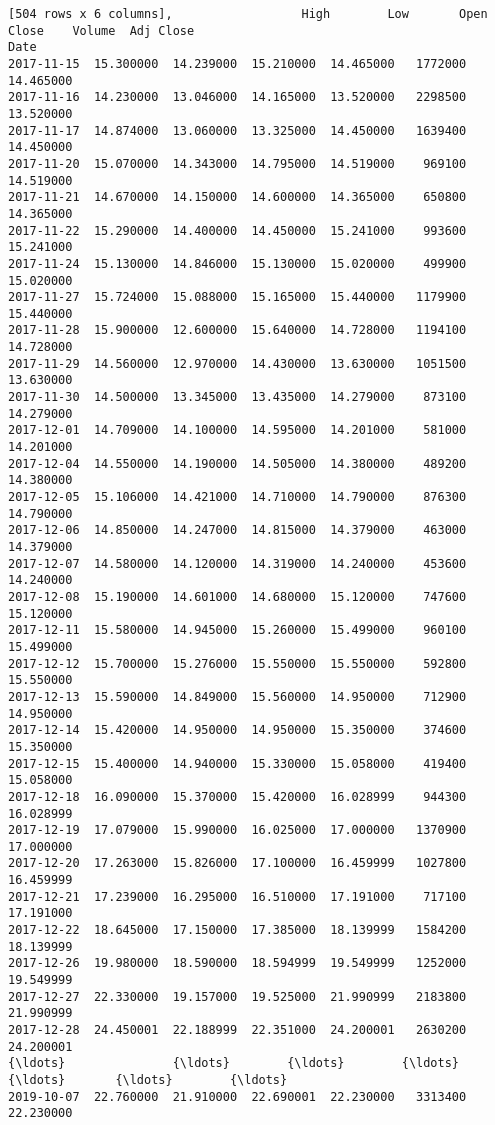 \documentclass[11pt]{article}
\begin{document}
\begin{Verbatim}[commandchars=\\\{\}]
[504 rows x 6 columns],                  High        Low       Open      Close    Volume  Adj Close
Date                                                                       
2017-11-15  15.300000  14.239000  15.210000  14.465000   1772000  14.465000
2017-11-16  14.230000  13.046000  14.165000  13.520000   2298500  13.520000
2017-11-17  14.874000  13.060000  13.325000  14.450000   1639400  14.450000
2017-11-20  15.070000  14.343000  14.795000  14.519000    969100  14.519000
2017-11-21  14.670000  14.150000  14.600000  14.365000    650800  14.365000
2017-11-22  15.290000  14.400000  14.450000  15.241000    993600  15.241000
2017-11-24  15.130000  14.846000  15.130000  15.020000    499900  15.020000
2017-11-27  15.724000  15.088000  15.165000  15.440000   1179900  15.440000
2017-11-28  15.900000  12.600000  15.640000  14.728000   1194100  14.728000
2017-11-29  14.560000  12.970000  14.430000  13.630000   1051500  13.630000
2017-11-30  14.500000  13.345000  13.435000  14.279000    873100  14.279000
2017-12-01  14.709000  14.100000  14.595000  14.201000    581000  14.201000
2017-12-04  14.550000  14.190000  14.505000  14.380000    489200  14.380000
2017-12-05  15.106000  14.421000  14.710000  14.790000    876300  14.790000
2017-12-06  14.850000  14.247000  14.815000  14.379000    463000  14.379000
2017-12-07  14.580000  14.120000  14.319000  14.240000    453600  14.240000
2017-12-08  15.190000  14.601000  14.680000  15.120000    747600  15.120000
2017-12-11  15.580000  14.945000  15.260000  15.499000    960100  15.499000
2017-12-12  15.700000  15.276000  15.550000  15.550000    592800  15.550000
2017-12-13  15.590000  14.849000  15.560000  14.950000    712900  14.950000
2017-12-14  15.420000  14.950000  14.950000  15.350000    374600  15.350000
2017-12-15  15.400000  14.940000  15.330000  15.058000    419400  15.058000
2017-12-18  16.090000  15.370000  15.420000  16.028999    944300  16.028999
2017-12-19  17.079000  15.990000  16.025000  17.000000   1370900  17.000000
2017-12-20  17.263000  15.826000  17.100000  16.459999   1027800  16.459999
2017-12-21  17.239000  16.295000  16.510000  17.191000    717100  17.191000
2017-12-22  18.645000  17.150000  17.385000  18.139999   1584200  18.139999
2017-12-26  19.980000  18.590000  18.594999  19.549999   1252000  19.549999
2017-12-27  22.330000  19.157000  19.525000  21.990999   2183800  21.990999
2017-12-28  24.450001  22.188999  22.351000  24.200001   2630200  24.200001
{\ldots}               {\ldots}        {\ldots}        {\ldots}        {\ldots}       {\ldots}        {\ldots}
2019-10-07  22.760000  21.910000  22.690001  22.230000   3313400  22.230000

\end{Verbatim}
\end{document}
